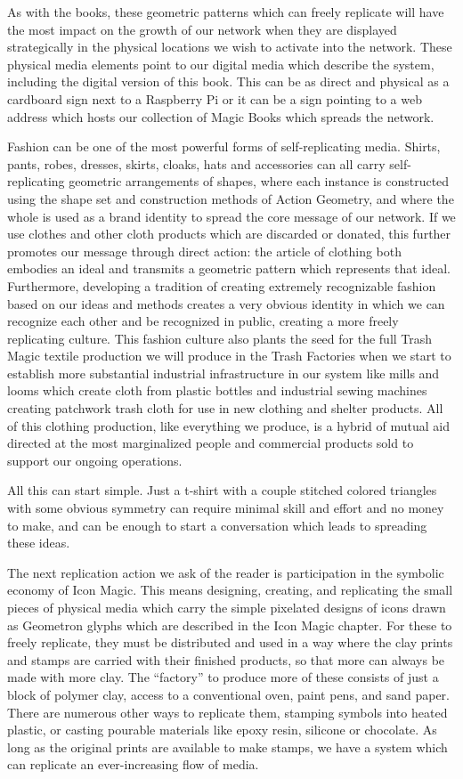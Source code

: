 As with the books, these geometric patterns which can freely replicate
will have the most impact on the growth of our network when they are
displayed strategically in the physical locations we wish to activate
into the network. These physical media elements point to our digital
media which describe the system, including the digital version of this
book. This can be as direct and physical as a cardboard sign next to a
Raspberry Pi or it can be a sign pointing to a web address which hosts
our collection of Magic Books which spreads the network.

Fashion can be one of the most powerful forms of self-replicating media.
Shirts, pants, robes, dresses, skirts, cloaks, hats and accessories can
all carry self-replicating geometric arrangements of shapes, where each
instance is constructed using the shape set and construction methods of
Action Geometry, and where the whole is used as a brand identity to
spread the core message of our network. If we use clothes and other
cloth products which are discarded or donated, this further promotes our
message through direct action: the article of clothing both embodies an
ideal and transmits a geometric pattern which represents that ideal.
Furthermore, developing a tradition of creating extremely recognizable
fashion based on our ideas and methods creates a very obvious identity
in which we can recognize each other and be recognized in public,
creating a more freely replicating culture. This fashion culture also
plants the seed for the full Trash Magic textile production we will
produce in the Trash Factories when we start to establish more
substantial industrial infrastructure in our system like mills and looms
which create cloth from plastic bottles and industrial sewing machines
creating patchwork trash cloth for use in new clothing and shelter
products. All of this clothing production, like everything we produce,
is a hybrid of mutual aid directed at the most marginalized people and
commercial products sold to support our ongoing operations.

All this can start simple. Just a t-shirt with a couple stitched colored
triangles with some obvious symmetry can require minimal skill and
effort and no money to make, and can be enough to start a conversation
which leads to spreading these ideas.

The next replication action we ask of the reader is participation in the
symbolic economy of Icon Magic. This means designing, creating, and
replicating the small pieces of physical media which carry the simple
pixelated designs of icons drawn as Geometron glyphs which are described
in the Icon Magic chapter. For these to freely replicate, they must be
distributed and used in a way where the clay prints and stamps are
carried with their finished products, so that more can always be made
with more clay. The ``factory'' to produce more of these consists of
just a block of polymer clay, access to a conventional oven, paint pens,
and sand paper. There are numerous other ways to replicate them,
stamping symbols into heated plastic, or casting pourable materials like
epoxy resin, silicone or chocolate. As long as the original prints are
available to make stamps, we have a system which can replicate an
ever-increasing flow of media.

